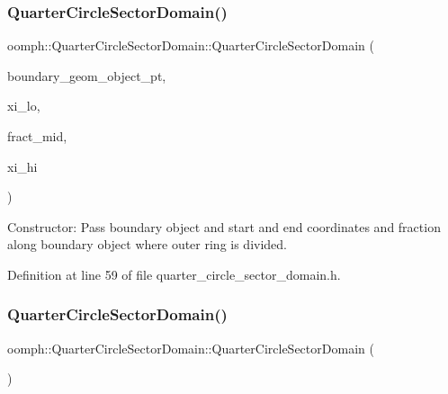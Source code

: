 \subsubsection{\texorpdfstring{Quarter\+Circle\+Sector\+Domain()}{QuarterCircleSectorDomain()}\hspace{0.1cm}{\footnotesize\ttfamily [1/2]}}
{\footnotesize\ttfamily oomph\+::\+Quarter\+Circle\+Sector\+Domain\+::\+Quarter\+Circle\+Sector\+Domain (\begin{DoxyParamCaption}\item[{Geom\+Object $\ast$}]{boundary\+\_\+geom\+\_\+object\+\_\+pt,  }\item[{const double \&}]{xi\+\_\+lo,  }\item[{const double \&}]{fract\+\_\+mid,  }\item[{const double \&}]{xi\+\_\+hi }\end{DoxyParamCaption})\hspace{0.3cm}{\ttfamily [inline]}}



Constructor\+: Pass boundary object and start and end coordinates and fraction along boundary object where outer ring is divided. 



Definition at line 59 of file quarter\+\_\+circle\+\_\+sector\+\_\+domain.\+h.

\mbox{\label{classoomph_1_1QuarterCircleSectorDomain_a08d26f31016ef7b40e6bdadfc1eee29a}} 
\subsubsection{\texorpdfstring{Quarter\+Circle\+Sector\+Domain()}{QuarterCircleSectorDomain()}\hspace{0.1cm}{\footnotesize\ttfamily [2/2]}}
{\footnotesize\ttfamily oomph\+::\+Quarter\+Circle\+Sector\+Domain\+::\+Quarter\+Circle\+Sector\+Domain (\begin{DoxyParamCaption}\item[{const \hyperlink{classoomph_1_1QuarterCircleSectorDomain}{Quarter\+Circle\+Sector\+Domain} \&}]{ }\end{DoxyParamCaption})\hspace{0.3cm}{\ttfamily [inline]}}



